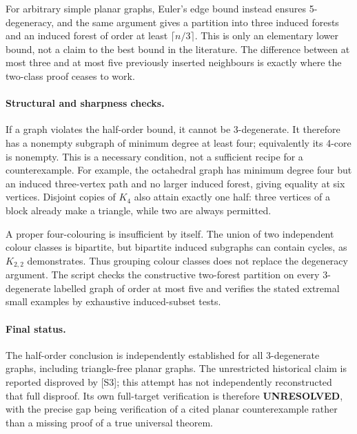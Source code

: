 \documentclass[11pt,a4paper]{article}
\begin{document}
For arbitrary simple planar graphs, Euler's edge bound instead ensures 5-degeneracy, and the same argument gives a partition into three induced forests and an induced forest of order at least $\lceil n/3\rceil$. This is only an elementary lower bound, not a claim to the best bound in the literature. The difference between at most three and at most five previously inserted neighbours is exactly where the two-class proof ceases to work.

\paragraph{Structural and sharpness checks.}
If a graph violates the half-order bound, it cannot be 3-degenerate. It therefore has a nonempty subgraph of minimum degree at least four; equivalently its 4-core is nonempty. This is a necessary condition, not a sufficient recipe for a counterexample. For example, the octahedral graph has minimum degree four but an induced three-vertex path and no larger induced forest, giving equality at six vertices. Disjoint copies of $K_4$ also attain exactly one half: three vertices of a block already make a triangle, while two are always permitted.

A proper four-colouring is insufficient by itself. The union of two independent colour classes is bipartite, but bipartite induced subgraphs can contain cycles, as $K_{2,2}$ demonstrates. Thus grouping colour classes does not replace the degeneracy argument. The script checks the constructive two-forest partition on every 3-degenerate labelled graph of order at most five and verifies the stated extremal small examples by exhaustive induced-subset tests.

\paragraph{Final status.}
The half-order conclusion is independently established for all 3-degenerate graphs, including triangle-free planar graphs. The unrestricted historical claim is reported disproved by [S3]; this attempt has not independently reconstructed that full disproof. Its own full-target verification is therefore \textbf{UNRESOLVED}, with the precise gap being verification of a cited planar counterexample rather than a missing proof of a true universal theorem.
\end{document}
